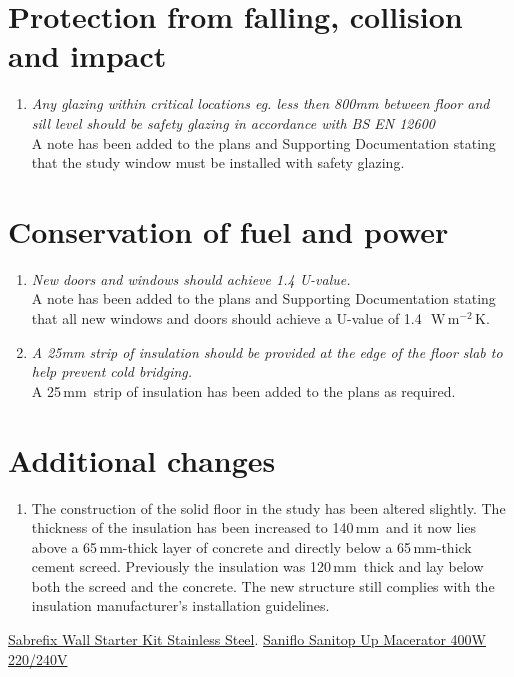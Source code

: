 \documentclass{extension}
\newcommand{\mm}{\,$\mathrm{mm}$}
\newcommand{\uunit}{\,$\mathrm{W\,m^{-2}\,K}$}
\begin{document}
\section{Protection from falling, collision and impact}
\begin{enumerate}
\item {\it Any glazing within critical locations eg. less then 800mm between floor and sill level should be safety glazing in accordance with BS EN 12600}\\
A note has been added to the plans and Supporting Documentation stating that the study window must be installed with safety glazing.
\end{enumerate}

\section{Conservation of fuel and power}
\begin{enumerate}
\item {\it New doors and windows should achieve 1.4 U-value.}\\
A note has been added to the plans and Supporting Documentation stating that all new windows and doors should achieve a U-value of 1.4~\uunit .
\item {\it A 25mm strip of insulation should be provided at the edge of the floor slab to help prevent cold bridging.}\\
A 25\mm\ strip of insulation has been added to the plans as required.
\end{enumerate}

\section{Additional changes}
\begin{enumerate}
\item The construction of the solid floor in the study has been altered slightly. The thickness of the insulation has been increased to 140\mm\ and it now lies above a 65\mm -thick layer of concrete and directly below a 65\mm -thick cement screed. Previously the insulation was 120\mm\ thick and lay below both the screed and the concrete. The new structure still complies with the insulation manufacturer's installation guidelines.
\end{enumerate}


\begin{thebibliography}{9}
 \href{https://www.screwfix.com/p/sabrefix-wall-starter-kit-stainless-steel/56037?kpid=56037&cm_mmc=Google-_-Datafeed-_-Building%20and%20Doors?kpid=KINASEKPID&cm_mmc=Google-_-TOKEN1-_-TOKEN2&gclid=EAIaIQobChMIvrnvoZmQgQMVjIFQBh3P7gMrEAQYAiABEgIWrvD_BwE&gclsrc=aw.ds}{Sabrefix Wall Starter Kit Stainless Steel}.
\href{https://www.screwfix.com/p/saniflo-sanitop-up-macerator-400w-220-240v/7924v}{Saniflo Sanitop Up Macerator 400W 220/240V}



\end{thebibliography}
\end{document}
